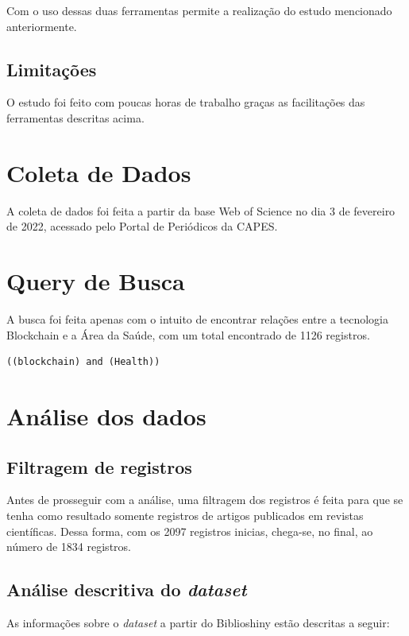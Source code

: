 Com o uso dessas duas ferramentas permite a realização do estudo mencionado anteriormente.

\subsection{Limitações}
O estudo foi feito com poucas horas de trabalho graças as facilitações das ferramentas descritas acima.

\section{Coleta de Dados}
A coleta de dados foi feita a partir da base Web of Science no dia 3 de fevereiro de 2022, acessado pelo Portal de Periódicos da CAPES.

\section{Query de Busca}
A busca foi feita apenas com o intuito de encontrar relações entre a tecnologia Blockchain e a Área da Saúde, com um total encontrado de 1126 registros.

\begin{lstlisting}[basicstyle = \normalsize]
    ((blockchain) and (Health))
    \end{lstlisting}

\section{Análise dos dados}

\subsection{Filtragem de registros}
Antes de prosseguir com a análise, uma filtragem dos registros é feita para que se tenha como resultado somente registros de artigos publicados em revistas científicas. Dessa forma, com os 2097 registros inicias, chega-se, no final, ao número de 1834 registros.

\subsection{Análise descritiva do \textit{dataset}}

As informações sobre o \textit{dataset} a partir do Biblioshiny estão descritas a seguir:

